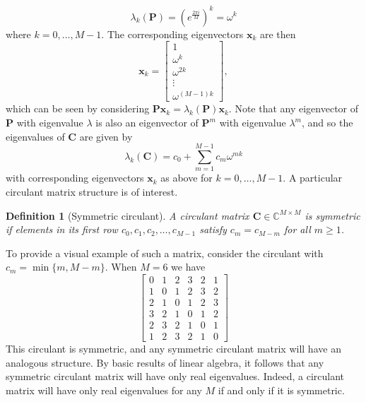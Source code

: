 \documentclass[letterpaper,12pt,oneside,final]{article}
\newtheorem{definition}{Definition}
\newcommand{\ve}[1]{\mathbf{#1}}           %
\newcommand{\m}[1]{\mathbf{#1}}               %
\newcommand{\field}[1]{\mathbb{#1}}
\newcommand{\Complex}{\field{C}}
\begin{document}
$$\lambda_k (\m{P}) = \left ( e^{\frac{2 \pi i}{M}} \right )^k = \omega^k$$
where $k = 0, \dots, M-1$. The corresponding eigenvectors $\ve{x}_k$ are then
\begin{equation} \label{eq:multipleTesting:circEigenVec}
  \ve{x}_k = \begin{bmatrix}
  1 \\
  \omega^k \\
  \omega^{2k} \\
  \vdots \\
  \omega^{(M-1)k}
\end{bmatrix},
\end{equation}
which can be seen by considering $\m{P} \ve{x}_k = \lambda_k(\m{P}) \ve{x}_k$. Note that any eigenvector of $\m{P}$ with eigenvalue $\lambda$ is also an eigenvector of $\m{P}^m$ with eigenvalue $\lambda^m$, and so the eigenvalues of $\m{C}$ are given by
\begin{equation} \label{eq:multipleTesting:circEigenVals}
  \lambda_k (\m{C}) = c_0 + \sum_{m = 1}^{M-1} c_m \omega^{mk}
\end{equation}
with corresponding eigenvectors $\ve{x}_k$ as above for $k = 0, \dots, M-1$. A particular circulant matrix structure is of interest.

\begin{definition}[Symmetric circulant] \label{def:symmCirc}
  A circulant matrix $\m{C} \in \Complex^{M \times M}$ is symmetric if elements in its first row $c_0, c_1, c_2, \dots, c_{M-1}$ satisfy $c_m = c_{M-m}$ for all $m \geq 1$.
\end{definition}

To provide a visual example of such a matrix, consider the circulant with $c_m = \min \{m, M-m\}$. When $M = 6$ we have
$$\begin{bmatrix}
  0 & 1 & 2 & 3 & 2 & 1 \\
  1 & 0 & 1 & 2 & 3 & 2 \\
  2 & 1 & 0 & 1 & 2 & 3 \\
  3 & 2 & 1 & 0 & 1 & 2 \\
  2 & 3 & 2 & 1 & 0 & 1 \\
  1 & 2 & 3 & 2 & 1 & 0
\end{bmatrix}$$
This circulant is symmetric, and any symmetric circulant matrix will have an analogous structure. By basic results of linear algebra, it follows that any symmetric circulant matrix will have only real eigenvalues. Indeed, a circulant matrix will have only real eigenvalues for any $M$ if and only if it is symmetric.
\end{document}
